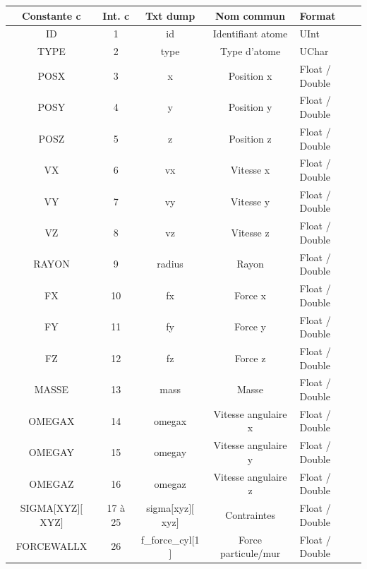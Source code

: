 \documentclass[a4paper,12pt]{article}
\begin{document}
{{{\begin{table}
\begin{minipage}{\linewidth}
\renewcommand{\footnoterule}{}
\renewcommand{\thefootnote}{\alph{footnote}}
\begin{tabular}{|c|c|c|c|l|} \hline
  \textbf{Constante c} & \textbf{Int. c} & \textbf{Txt dump} & \textbf{Nom commun} & \textbf{Format} \\ \hline
   ID      &1   & id & Identifiant atome & UInt\\ \hline
   TYPE    &2   & type & Type d'atome      & UChar\\ \hline
   POSX    &3   & x & Position x        & Float / Double\\ \hline
   POSY    &4   & y & Position y       & Float / Double\\ \hline
   POSZ    &5   & z & Position z        & Float / Double\\ \hline
   VX      &6   & vx & Vitesse x         & Float / Double\\ \hline
   VY      &7   & vy & Vitesse y         & Float / Double\\ \hline
   VZ      &8   & vz & Vitesse z         & Float / Double\\ \hline
   RAYON   &9 & radius  & Rayon             & Float / Double\\ \hline
   FX      &10  & fx & Force x           & Float / Double\\ \hline
   FY      &11  & fy &Force y           & Float / Double\\ \hline
   FZ      &12  & fz & Force z           & Float / Double\\ \hline   
   MASSE      &13  & mass & Masse           & Float / Double  \footnotemark[2]\\ \hline
   OMEGAX      &14  & omegax & Vitesse angulaire x \footnotemark[3]  & Float / Double \footnotemark[2] \\ \hline
   OMEGAY      &15  & omegay & Vitesse angulaire y  \footnotemark[3]  & Float / Double \footnotemark[2]\\ \hline
   OMEGAZ      &16  & omegaz & Vitesse angulaire z  \footnotemark[3]  & Float / Double \footnotemark[2]\\ \hline
   SIGMA$[$XYZ$][$XYZ$]$      &17 \`a 25 & sigma$[$xyz$][$xyz$]$ & Contraintes \footnotemark[3] & Float / Double  \footnotemark[2]\\ \hline
   FORCEWALLX   &26  & f\_force\_cyl$[$1$]$ & Force particule/mur           & Float / Double \footnotemark[2]\\ \hline

\end{tabular}
\end{minipage}
\end{table}}}}
\end{document}
